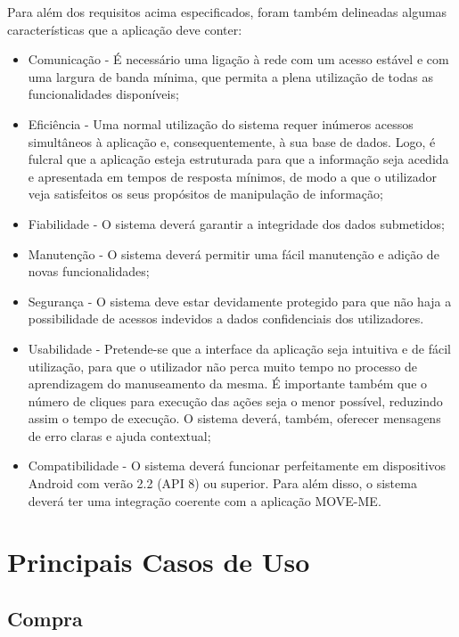 Para além dos requisitos acima especificados, foram também delineadas algumas características que a aplicação deve conter:
\begin{itemize}
\item Comunicação - É necessário uma ligação à rede com um acesso estável e com uma largura de banda mínima, que permita a plena utilização de todas as funcionalidades disponíveis;
\item Eficiência - Uma normal utilização do sistema requer inúmeros acessos simultâneos à aplicação e, consequentemente, à sua base de dados. Logo, é fulcral que a aplicação esteja estruturada para que a informação seja acedida e apresentada em tempos de resposta mínimos, de modo a que o utilizador veja satisfeitos os seus propósitos de manipulação de informação;
\item Fiabilidade - O sistema deverá garantir a integridade dos dados submetidos;
\item Manutenção - O sistema deverá permitir uma fácil manutenção e adição de novas funcionalidades;
\item Segurança - O sistema deve estar devidamente protegido para que não haja a possibilidade de acessos indevidos a dados confidenciais dos utilizadores.
\item Usabilidade - Pretende-se que a interface da aplicação seja intuitiva e de fácil utilização, para que o utilizador não perca muito tempo no processo de aprendizagem do manuseamento da mesma. É importante também que o número de cliques para execução das ações seja o menor possível, reduzindo assim o tempo de execução. O sistema deverá, também, oferecer mensagens de erro claras e ajuda contextual;
\item Compatibilidade - O sistema deverá funcionar perfeitamente em dispositivos Android com verão 2.2 (API 8) ou superior. Para além disso, o sistema deverá ter uma integração coerente com a aplicação MOVE-ME.
\end{itemize}

\section{Principais Casos de Uso}

\subsection{Compra}

